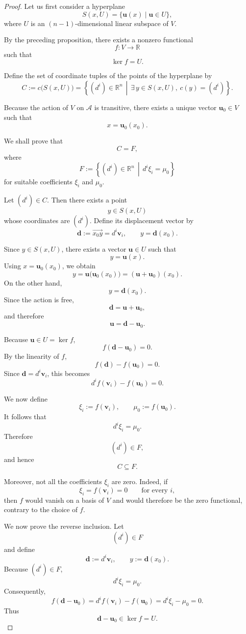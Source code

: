 \documentclass[12pt]{article}
\begin{document}
\begin{proof}
Let us first consider a hyperplane
\[
S(x,U)=\{\mathbf u(x)\mid \mathbf u\in U\},
\]
where $U$ is an $(n-1)$-dimensional linear subspace of $V$.

By the preceding proposition, there exists a nonzero functional
\[
f:V\longrightarrow\mathbb R
\]
such that
\[
\ker f=U.
\]

Define the set of coordinate tuples of the points of the hyperplane by
\[
C:=c\bigl(S(x,U)\bigr)
  =\left\{(d^i)\in\mathbb R^n
    \,\middle|\,
    \exists\,y\in S(x,U),\ c(y)=(d^i)
   \right\}.
\]

Because the action of $V$ on $\mathcal A$ is transitive, there exists a unique
vector $\mathbf u_0\in V$ such that
\[
x=\mathbf u_0(x_0).
\]

We shall prove that
\[
C=F,
\]
where
\[
F:=\left\{(d^i)\in\mathbb R^n
          \,\middle|\,
          d^i\xi_i=\mu_0
   \right\}
\]
for suitable coefficients $\xi_i$ and $\mu_0$.

Let $(d^i)\in C$. Then there exists a point
\[
y\in S(x,U)
\]
whose coordinates are $(d^i)$. Define its displacement vector by
\[
\mathbf d:=\overrightarrow{x_0y}=d^i\mathbf v_i,
\qquad
y=\mathbf d(x_0).
\]

Since $y\in S(x,U)$, there exists a vector $\mathbf u\in U$ such that
\[
y=\mathbf u(x).
\]
Using $x=\mathbf u_0(x_0)$, we obtain
\[
y
 =\mathbf u\bigl(\mathbf u_0(x_0)\bigr)
 =(\mathbf u+\mathbf u_0)(x_0).
\]
On the other hand,
\[
y=\mathbf d(x_0).
\]
Since the action is free,
\[
\mathbf d=\mathbf u+\mathbf u_0,
\]
and therefore
\[
\mathbf u=\mathbf d-\mathbf u_0.
\]

Because $\mathbf u\in U=\ker f$,
\[
f(\mathbf d-\mathbf u_0)=0.
\]
By the linearity of $f$,
\[
f(\mathbf d)-f(\mathbf u_0)=0.
\]
Since $\mathbf d=d^i\mathbf v_i$, this becomes
\[
d^if(\mathbf v_i)-f(\mathbf u_0)=0.
\]

We now define
\[
\xi_i:=f(\mathbf v_i),
\qquad
\mu_0:=f(\mathbf u_0).
\]
It follows that
\[
d^i\xi_i=\mu_0.
\]
Therefore
\[
(d^i)\in F,
\]
and hence
\[
C\subseteq F.
\]

Moreover, not all the coefficients $\xi_i$ are zero. Indeed, if
\[
\xi_i=f(\mathbf v_i)=0
\qquad
\text{for every }i,
\]
then $f$ would vanish on a basis of $V$ and would therefore be the zero
functional, contrary to the choice of $f$.

We now prove the reverse inclusion. Let
\[
(d^i)\in F
\]
and define
\[
\mathbf d:=d^i\mathbf v_i,
\qquad
y:=\mathbf d(x_0).
\]
Because $(d^i)\in F$,
\[
d^i\xi_i=\mu_0.
\]
Consequently,
\[
f(\mathbf d-\mathbf u_0)
 =d^if(\mathbf v_i)-f(\mathbf u_0)
 =d^i\xi_i-\mu_0
 =0.
\]
Thus
\[
\mathbf d-\mathbf u_0\in\ker f=U.
\]


\end{proof}
\end{document}
